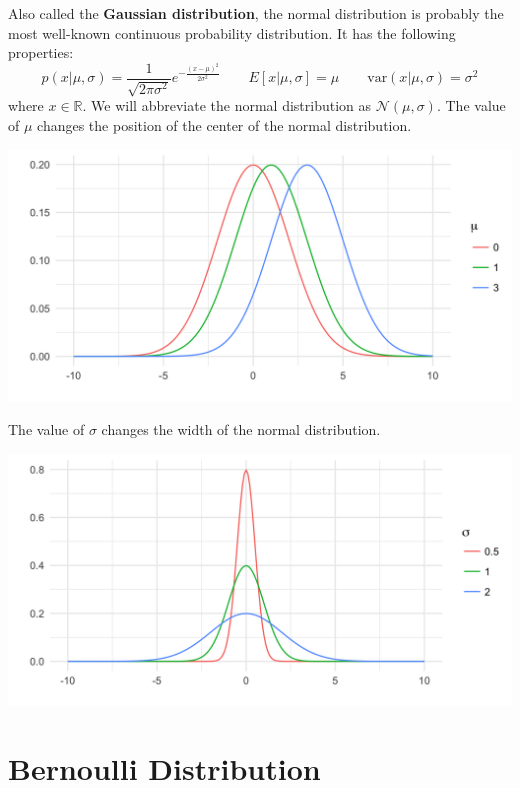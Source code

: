 Also called the \textbf{Gaussian distribution}, the normal distribution is probably the most well-known continuous probability distribution. It has the following properties:
\begin{equation*} p(x | \mu, \sigma) = \frac{1}{\sqrt{2 \pi \sigma^2}} e^{-\frac{(x-\mu)^2}{2 \sigma^2}} \qquad  E[x| \mu, \sigma] = \mu \qquad \text{var}(x | \mu, \sigma) = \sigma^2 \end{equation*}
where $x \in \mathbb{R}$. We will abbreviate the normal distribution as $\mathcal{N}(\mu, \sigma)$.  The value of $\mu$ changes the position of the center of the normal distribution.
\begin{center}
\includegraphics[width=\textwidth]{img/l01-figure1a-normal-mean-change.png}
\end{center}
The value of $\sigma$ changes the width of the normal distribution.
\begin{center}
\includegraphics[width=\textwidth]{img/l01-figure1b-normal-sd-change.png}
\end{center}
 

\section{Bernoulli Distribution}

